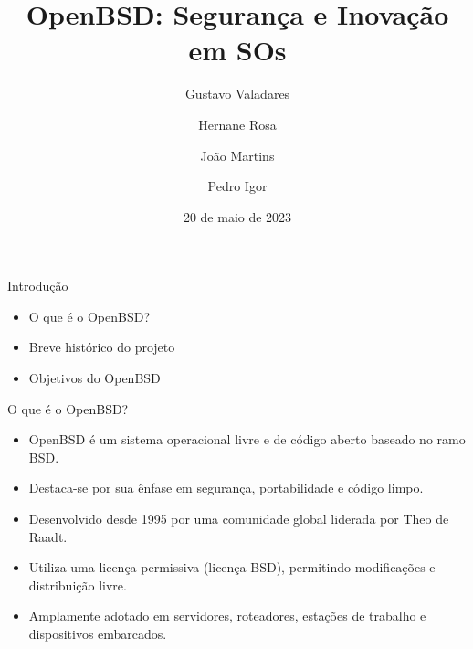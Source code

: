 \documentclass[9pt,xcolor=table]{beamer}
\date{20 de maio de 2023}
\title{OpenBSD: Segurança e Inovação em SOs}
\institute[PUC]{Pontifícia Universidade Católica de Minas Gerais}
\author[Gustavo, Hernane, João Víctor, Pedro]{Gustavo Valadares \and Hernane Rosa \and João Martins \and Pedro Igor}
\begin{document}
\begin{frame}
  \titlepage
\end{frame}
\begin{frame}{Introdução}
  \begin{itemize}
    \item O que é o OpenBSD?
    \item Breve histórico do projeto
    \item Objetivos do OpenBSD
  \end{itemize}
\end{frame}
\begin{frame}{O que é o OpenBSD?}
  \begin{itemize}
    \item OpenBSD é um sistema operacional livre e de código aberto baseado no ramo BSD.
    \item Destaca-se por sua ênfase em segurança, portabilidade e código limpo.
    \item Desenvolvido desde 1995 por uma comunidade global liderada por Theo de Raadt.
    \item Utiliza uma licença permissiva (licença BSD), permitindo modificações e distribuição livre.
    \item Amplamente adotado em servidores, roteadores, estações de trabalho e dispositivos embarcados.
  \end{itemize}
\end{frame}
\end{document}
